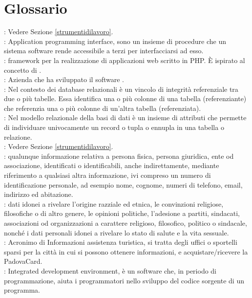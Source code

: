 \clearpage\null\newpage
\pagebreak
\section{Glossario}
: Vedere Sezione \ref{strumentidilavoro}. \\
: Application programming interface, sono un insieme di procedure che un sistema software rende accessibile a terzi per interfacciarsi ad esso. \\
: framework per la realizzazione di applicazioni web scritto in PHP. È ispirato al concetto di . \\
: Azienda che ha sviluppato il software \tlite. \\
: Nel contesto dei database relazionali è un vincolo di integrità referenziale tra due o più tabelle. Essa identifica una o più colonne di una tabella (referenziante) che referenzia una o più colonne di un'altra tabella (referenziata). \\
: Nel modello relazionale della basi di dati è un insieme di attributi che permette di individuare univocamente un record o tupla o ennupla in una tabella o relazione. \\
: Vedere Sezione \ref{strumentidilavoro}. \\
: qualunque informazione relativa a persona fisica, persona giuridica, ente od associazione, identificati o identificabili, anche indirettamente, mediante riferimento a qualsiasi altra informazione, ivi compreso un numero di identificazione personale, ad esempio nome, cognome, numeri di telefono, email, indirizzo ed abitazione. \\
: dati idonei a rivelare l'origine razziale ed etnica, le convinzioni religiose, filosofiche o di altro genere, le opinioni politiche, l'adesione a partiti, sindacati, associazioni od organizzazioni a carattere religioso, filosofico, politico o sindacale, nonché i dati personali idonei a rivelare lo stato di salute e la vita sessuale. \\
: Acronimo di Informazioni assistenza turistica, si tratta degli uffici o sportelli sparsi per la città in cui si possono ottenere informazioni, e acquistare/ricevere la PadovaCard. \\
: Integrated development environment,  è un software che, in periodo di programmazione, aiuta i programmatori nello sviluppo del codice sorgente di un programma. \\
